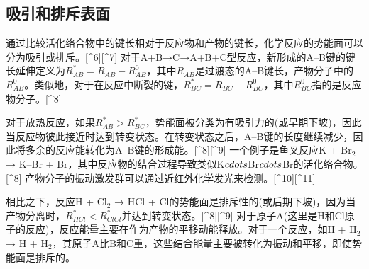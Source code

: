 \subsection{吸引和排斥表面}
通过比较活化络合物中的键长相对于反应物和产物的键长，化学反应的势能面可以分为吸引或排斥。[^6][^7] 对于A+B→C→A+B+C型反应，新形成的A–B键的键长延伸定义为$R^*_{AB} = R_{AB} - R^0_{AB}$，其中$R_{AB}$是过渡态的A–B键长，产物分子中的$R^0_{AB}$。类似地，对于在反应中断裂的键，$R^*_{BC} = R_{BC} - R^0_{BC}$，其中$R^0_{BC}$指的是反应物分子。[^8]

对于放热反应，如果$R^*_{AB} > R^*_{BC}$，势能面被分类为有吸引力的(或早期下坡)，因此当反应物彼此接近时达到转变状态。在转变状态之后，A–B键的长度继续减少，因此将多余的反应能转化为A–B键的形成能。[^8][^9] 一个例子是鱼叉反应K + Br$_2$ → K–Br + Br，其中反应物的结合过程导致类似K$\\cdots$Br$\\cdots$Br的活化络合物。[^8] 产物分子的振动激发群可以通过近红外化学发光来检测。[^10][^11]

相比之下，反应H + Cl$_2$ → HCl + Cl的势能面是排斥性的(或后期下坡)，因为当产物分离时，$R^*_{HCl} < R^*_{ClCl}$并达到转变状态。[^8][^9] 对于原子A(这里是H和Cl原子的反应)，反应能量主要在作为产物的平移动能释放。对于一个反应，如H + H$_2$ → H + H$_2$，其原子A比B和C重，这些结合能量主要被转化为振动和平移，即使势能面是排斥的。
